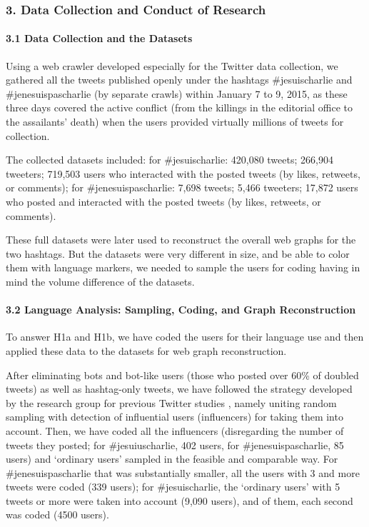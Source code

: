 \subsubsection{3. Data Collection and Conduct of Research}

\paragraph{3.1 Data Collection and the Datasets}
Using a web crawler developed especially for the Twitter data collection, we gathered all the tweets published openly under the hashtags \#jesuischarlie and \#jenesuispascharlie (by separate crawls) within January 7 to 9, 2015, as these three days covered the active conflict (from the killings in the editorial office to the assailants’ death) when the users provided virtually millions of tweets for collection.

The collected datasets included: for \#jesuischarlie: 420,080 tweets; 266,904 tweeters; 719,503 users who interacted with the posted tweets (by likes, retweets, or comments); for \#jenesuispascharlie: 7,698 tweets; 5,466 tweeters; 17,872 users who posted and interacted with the posted tweets (by likes, retweets, or comments).

These full datasets were later used to reconstruct the overall web graphs for the two hashtags. But the datasets were very different in size, and be able to color them with language markers, we needed to sample the users for coding having in mind the volume difference of the datasets.

\paragraph{3.2 Language Analysis: Sampling, Coding, and Graph Reconstruction} 
To answer H1a and H1b, we have coded the users for their language use and then applied these data to the datasets for web graph reconstruction.

After eliminating bots and bot-like users (those who posted over 60\% of doubled tweets) as well as hashtag-only tweets, we have followed the strategy developed by the research group for previous Twitter studies \cite{Authors2016a,Authors2016b,Authors2018}, namely uniting random sampling with detection of influential users (influencers) for taking them into account. Then, we have coded all the influencers (disregarding the number of tweets they posted; for \#jesuiuscharlie, 402 users, for \#jenesuispascharlie, 85 users) and ‘ordinary users’ sampled in the feasible and comparable way. For \#jenesuispascharlie that was substantially smaller, all the users with 3 and more tweets were coded (339 users); for \#jesuischarlie, the ‘ordinary users’ with 5 tweets or more were taken into account (9,090 users), and of them, each second was coded (4500 users).

